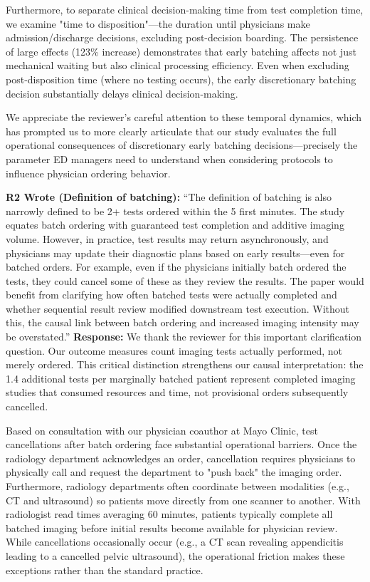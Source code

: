 \documentclass[11pt]{article}
\newenvironment{quote2}
{ \bigskip
\noindent
         \small\em
         \baselineskip=14pt
}
\newcommand{\1}{\hbox{\rm 1\kern-.35em 1}}
\begin{document}
{Furthermore, to separate clinical decision-making time from test completion time, we examine "time to disposition"—the duration until physicians make admission/discharge decisions, excluding post-decision boarding. The persistence of large effects (123\% increase) demonstrates that early batching affects not just mechanical waiting but also clinical processing efficiency. Even when excluding post-disposition time (where no testing occurs), the early discretionary batching decision substantially delays clinical decision-making.

We appreciate the reviewer's careful attention to these temporal dynamics, which has prompted us to more clearly articulate that our study evaluates the full operational consequences of discretionary early batching decisions—precisely the parameter ED managers need to understand when considering protocols to influence physician ordering behavior.
\color{black}


\begin{quote2}
\textbf{R2 Wrote (Definition of batching):}  
``The definition of batching is also narrowly defined to be 2+ tests ordered within the 5 first minutes. The study equates batch ordering with guaranteed test completion and additive imaging volume. However, in practice, test results may return asynchronously, and physicians may update their diagnostic plans based on early results—even for batched orders. For example, even if the physicians initially batch ordered the tests, they could cancel some of these as they review the results. The paper would benefit from clarifying how often batched tests were actually completed and whether sequential result review modified downstream test execution. Without this, the causal link between batch ordering and increased imaging intensity may be overstated.” 
\end{quote2}

\noindent\textbf{Response:} \color{blue}
We thank the reviewer for this important clarification question. Our outcome measures count imaging tests actually performed, not merely ordered. This critical distinction strengthens our causal interpretation: the 1.4 additional tests per marginally batched patient represent completed imaging studies that consumed resources and time, not provisional orders subsequently cancelled.

Based on consultation with our physician coauthor at Mayo Clinic, test cancellations after batch ordering face substantial operational barriers. Once the radiology department acknowledges an order, cancellation requires physicians to physically call and request the department to "push back" the imaging order. Furthermore, radiology departments often coordinate between modalities (e.g., CT and ultrasound) so patients move directly from one scanner to another. With radiologist read times averaging 60 minutes, patients typically complete all batched imaging before initial results become available for physician review. While cancellations occasionally occur (e.g., a CT scan revealing appendicitis leading to a cancelled pelvic ultrasound), the operational friction makes these exceptions rather than the standard practice.

}
\end{document}

